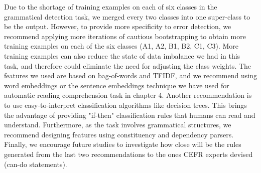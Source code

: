 Due to the shortage of training examples on each of six classes in the grammatical detection task, we merged every two classes into one super-class to be the output. However, to provide more specificity to error detection, we recommend applying more iterations of cautious bootstrapping to obtain more training examples on each of the six classes (A1, A2, B1, B2, C1, C3). More training examples can also reduce the state of data imbalance we had in this task, and therefore could eliminate the need for adjusting the class weights. The features we used are based on bag-of-words and TFIDF, and we recommend using word embeddings or the sentence embeddings technique we have used for automatic reading comprehension task in chapter 4. Another recommendation is to use easy-to-interpret classification algorithms like decision trees. This brings the advantage of providing "if-then" classification rules that humans can read and understand. Furthermore, as the task involves grammatical structures, we recommend designing features using constituency and dependency parsers. Finally, we encourage future studies to investigate how close will be the rules generated from the last two recommendations to the ones CEFR experts devised (can-do statements). 


